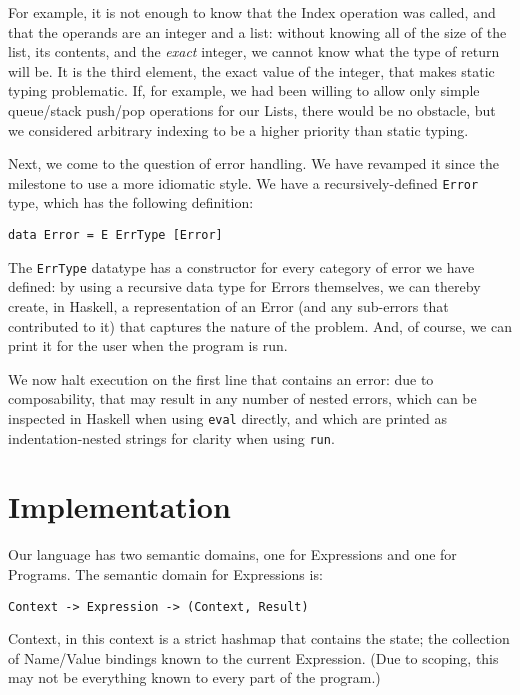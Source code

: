 \documentclass{article}
\begin{document}
For example, it is not enough to know that the Index operation was called, and that the operands are an integer and a list: without knowing all of the size of the list, its contents, and the \emph{exact} integer, we cannot know what the type of return will be.  It is the third element, the exact value of the integer, that makes static typing problematic.  If, for example, we had been willing to allow only simple queue/stack push/pop operations for our Lists, there would be no obstacle, but we considered arbitrary indexing to be a higher priority than static typing.

Next, we come to the question of error handling.  We have revamped it since the milestone to use a more idiomatic style.  We have a recursively-defined \texttt{Error} type, which has the following definition:

\begin{lstlisting}
data Error = E ErrType [Error]
\end{lstlisting}

The \texttt{ErrType} datatype has a constructor for every category of error we have defined: by using a recursive data type for Errors themselves, we can thereby create, in Haskell, a representation of an Error (and any sub-errors that contributed to it) that captures the nature of the problem.  And, of course, we can print it for the user when the program is run.

We now halt execution on the first line that contains an error: due to composability, that may result in any number of nested errors, which can be inspected in Haskell when using \texttt{eval} directly, and which are printed as indentation-nested strings for clarity when using \texttt{run}.

\section*{Implementation}

Our language has two semantic domains, one for Expressions and one for Programs.  The semantic domain for Expressions is:

\begin{lstlisting}
Context -> Expression -> (Context, Result)
\end{lstlisting}

Context, in this context is a strict hashmap that contains the state; the collection of Name/Value bindings known to the current Expression.  (Due to scoping, this may not be everything known to every part of the program.)
\end{document}
